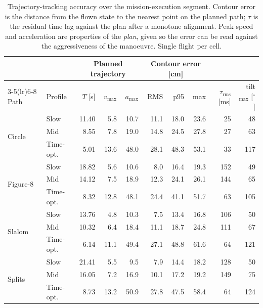 \begin{table}[t]
\centering
\caption{Trajectory-tracking accuracy over the mission-execution segment.
Contour error is the distance from the flown state to the nearest point on
the planned path; $\tau$ is the residual time lag against the plan after a
monotone alignment. Peak speed and acceleration are properties of the
\emph{plan}, given so the error can be read against the aggressiveness of
the manoeuvre. Single flight per cell.}
\label{tab:tracking}
\begin{tabular}{llrrrrrrrr}
\toprule
& & \multicolumn{3}{c}{Planned trajectory} & \multicolumn{3}{c}{Contour error [cm]} & & \\
\cmidrule(lr){3-5}\cmidrule(lr){6-8}
Path & Profile & $T$ [s] & $v_{\max}$ & $a_{\max}$ & RMS & p95 & max
     & $\tau_{\mathrm{rms}}$ [ms] & tilt$_{\max}$ [$^\circ$] \\
\midrule
\multirow{3}{*}{Circle} & Slow & 11.40 & 5.8 & 10.7 & 11.1 & 18.0 & 23.6 & 25 & 48 \\
 & Mid & 8.55 & 7.8 & 19.0 & 14.8 & 24.5 & 27.8 & 27 & 63 \\
 & Time-opt. & 5.01 & 13.6 & 48.0 & 28.1 & 48.3 & 53.1 & 33 & 117 \\
\midrule
\multirow{3}{*}{Figure-8} & Slow & 18.82 & 5.6 & 10.6 & 8.0 & 16.4 & 19.3 & 152 & 49 \\
 & Mid & 14.12 & 7.5 & 18.9 & 12.3 & 24.1 & 26.1 & 144 & 65 \\
 & Time-opt. & 8.32 & 12.8 & 48.1 & 24.4 & 41.1 & 51.7 & 63 & 105 \\
\midrule
\multirow{3}{*}{Slalom} & Slow & 13.76 & 4.8 & 10.3 & 7.5 & 13.4 & 16.8 & 106 & 50 \\
 & Mid & 10.32 & 6.4 & 18.4 & 11.1 & 18.7 & 24.8 & 111 & 67 \\
 & Time-opt. & 6.14 & 11.1 & 49.4 & 27.1 & 48.8 & 61.6 & 64 & 121 \\
\midrule
\multirow{3}{*}{Splits} & Slow & 21.41 & 5.5 & 9.5 & 7.9 & 14.4 & 18.2 & 128 & 50 \\
 & Mid & 16.05 & 7.2 & 16.9 & 10.1 & 17.2 & 19.2 & 149 & 75 \\
 & Time-opt. & 8.73 & 13.2 & 50.9 & 27.8 & 47.5 & 58.4 & 64 & 124 \\
\bottomrule
\end{tabular}
\end{table}
